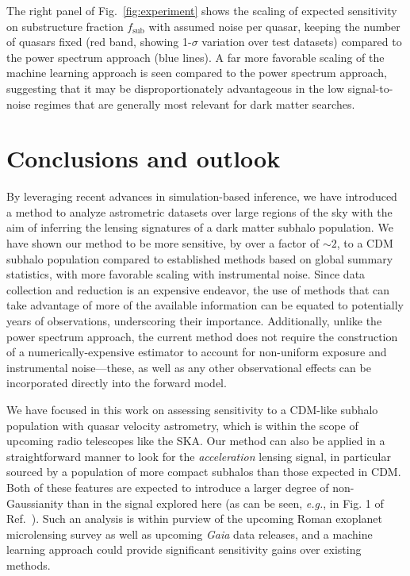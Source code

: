 \documentclass[]{article}
\begin{document}
The right panel of Fig.~\ref{fig:experiment} shows the scaling of expected sensitivity on substructure fraction $f_\mathrm{sub}$ with assumed noise per quasar, keeping the number of quasars fixed (red band, showing 1-$\sigma$ variation over test datasets) compared to the power spectrum approach (blue lines). A far more favorable scaling of the machine learning approach is seen compared to the power spectrum approach, suggesting that it may be disproportionately advantageous in the low signal-to-noise regimes that are generally most relevant for dark matter searches.

\section{Conclusions and outlook}
\label{sec:conclusions}

By leveraging recent advances in simulation-based inference, we have introduced a method to analyze astrometric datasets over large regions of the sky with the aim of inferring the lensing signatures of a dark matter subhalo population. We have shown our method to be more sensitive, by over a factor of $\sim 2$, to a CDM subhalo population compared to established methods based on global summary statistics, with more favorable scaling with instrumental noise. Since data collection and reduction is an expensive endeavor, the use of methods that can take advantage of more of the available information can be equated to potentially years of observations, underscoring their importance. Additionally, unlike the power spectrum approach, the current method does not require the construction of a numerically-expensive estimator to account for non-uniform exposure and instrumental noise---these, as well as any other observational effects can be incorporated directly into the forward model.

We have focused in this work on assessing sensitivity to a CDM-like subhalo population with quasar velocity astrometry, which is within the scope of upcoming radio telescopes like the SKA. Our method can also be applied in a straightforward manner to look for the \emph{acceleration} lensing signal, in particular sourced by a population of more compact subhalos than those expected in CDM. Both of these features are expected to introduce a larger degree of non-Gaussianity than in the signal explored here (as can be seen, \emph{e.g.}, in Fig. 1 of Ref.~\cite{Mishra-Sharma:2020ynk}). Such an analysis is within purview of the upcoming Roman exoplanet microlensing survey as well as upcoming \emph{Gaia} data releases, and a machine learning approach could provide significant sensitivity gains over existing methods.
\end{document}
